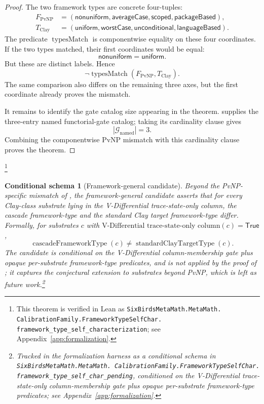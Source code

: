 \documentclass[11pt]{article}
\newcommand{\VDTSO}{V-Differential trace-state-only column}
\newtheorem{schema}[theorem]{Conditional schema}
\theoremstyle{definition}
\begin{document}
\begin{proof}
The two framework types are concrete four-tuples:
\[
\begin{aligned}
  F_{\mathrm{PvNP}}
  &=
  (\mathsf{nonuniform},\mathsf{averageCase},
    \mathsf{scoped},\mathsf{packageBased}),\\
  T_{\mathrm{Clay}}
  &=
  (\mathsf{uniform},\mathsf{worstCase},
    \mathsf{unconditional},\mathsf{languageBased}).
\end{aligned}
\]
The predicate \(\operatorname{typesMatch}\) is componentwise equality
on these four coordinates.  If the two types matched, their first
coordinates would be equal:
\[
  \mathsf{nonuniform}=\mathsf{uniform}.
\]
But these are distinct labels.  Hence
\[
  \neg\operatorname{typesMatch}(F_{\mathrm{PvNP}},T_{\mathrm{Clay}}).
\]
The same comparison also differs on the remaining three axes, but the
first coordinate already proves the mismatch.

It remains to identify the gate catalog size appearing in the theorem.
 supplies the three-entry named
functorial-gate catalog; taking its cardinality clause gives
\[
  |\mathcal G_{\mathrm{named}}|=3.
\]
Combining the componentwise PvNP mismatch with this cardinality clause
proves the theorem.
\end{proof}\footnote{\raggedright This theorem is verified in Lean as
\texttt{SixBirdsMetaMath.MetaMath.\allowbreak
CalibrationFamily.FrameworkTypeSelfChar.\allowbreak
framework\_type\_self\_characterization}; see
Appendix~\ref{app:formalization}.}

\begin{schema}[Framework-general candidate]\label{sch:framework-type-pending}
Beyond the PvNP-specific mismatch of
, the framework-general candidate
asserts that for every Clay-class substrate lying in the V-Differential
trace-state-only column, the cascade framework-type and the standard
Clay target framework-type differ. Formally, for substrates \(c\) with
\(\mbox{\VDTSO}(c)=\mathsf{True}\),
\[
  \operatorname{cascadeFrameworkType}(c)\neq
  \operatorname{standardClayTargetType}(c).
\]
The candidate is conditional on the V-Differential column-membership
gate plus opaque per-substrate framework-type predicates, and is not
applied by the proof of ; it captures
the conjectural extension to substrates beyond PvNP, which is left as
future work.\footnote{\raggedright Tracked in the formalization harness
as a conditional schema in \texttt{SixBirdsMetaMath.MetaMath.\allowbreak
CalibrationFamily.FrameworkTypeSelfChar.\allowbreak
framework\_type\_self\_char\_pending}, conditioned on the V-Differential
trace-state-only column-membership gate plus opaque per-substrate
framework-type predicates; see Appendix~\ref{app:formalization}.}
\end{schema}
\end{document}
